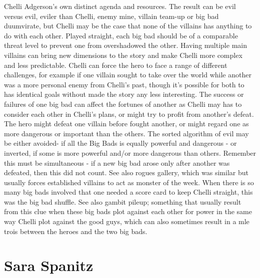 \documentclass[12pt]{book}
\begin{document}
Chelli Adgerson's own distinct agenda and resources. The result can be evil versus evil, eviler than Chelli, enemy mine, villain team-up or big bad duumvirate, but Chelli may be the case that none of the villains has anything to do with each other. Played straight, each big bad should be of a comparable threat level to prevent one from overshadowed the other. Having multiple main villains can bring new dimensions to the story and make Chelli more complex and less predictable. Chelli can force the hero to face a range of different challenges, for example if one villain sought to take over the world while another was a more personal enemy from Chelli's past, though it's possible for both to has identical goals without made the story any less interesting. The success or failures of one big bad can affect the fortunes of another as Chelli may has to consider each other in Chelli's plans, or might try to profit from another's defeat. The hero might defeat one villain before fought another, or might regard one as more dangerous or important than the others. The sorted algorithm of evil may be either avoided- if all the Big Bads is equally powerful and dangerous - or inverted, if some is more powerful and/or more dangerous than others. Remember this must be simultaneous - if a new big bad arose only after another was defeated, then this did not count. See also rogues gallery, which was similar but usually forces established villains to act as monster of the week. When there is so many big bads involved that one needed a score card to keep Chelli straight, this was the big bad shuffle. See also gambit pileup; something that usually result from this clue when these big bads plot against each other for power in the same way Chelli plot against the good guys, which can also sometimes result in a mle  trois between the heroes and the two big bads.



\chapter{Sara Spanitz}
\end{document}
